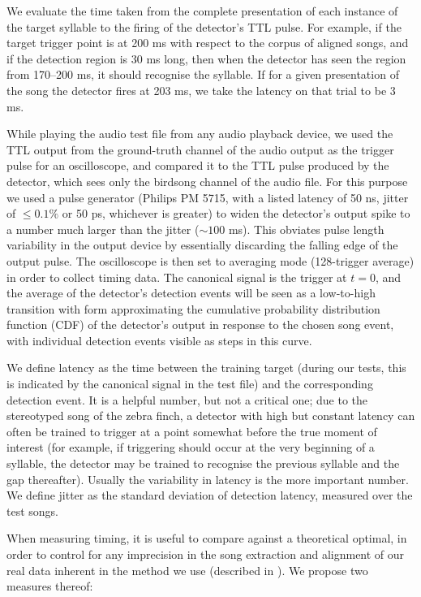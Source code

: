 \documentclass[10pt,letterpaper]{article}
\begin{document}
We evaluate the time taken from the complete presentation of each
instance of the target syllable to the firing of the detector's TTL
pulse.  For example, if the target trigger point is at 200 ms with
respect to the corpus of aligned songs, and if the detection region is
30 ms long, then when the detector has seen the region from 170--200
ms, it should recognise the syllable.  If for a given presentation of
the song the detector fires at 203 ms, we take the latency on that
trial to be 3 ms.

While playing the audio test file from any audio playback device, we
used the TTL output from the ground-truth channel of the audio output
as the trigger pulse for an oscilloscope, and compared it to the TTL
pulse produced by the detector, which sees only the birdsong channel
of the audio file. For this purpose we used a pulse generator (Philips
PM 5715, with a listed latency of 50 ns, jitter of $\leq 0.1\%$ or 50
ps, whichever is greater) to widen the detector's output spike to a
number much larger than the jitter ($\sim 100$ ms).  This obviates
pulse length variability in the output device by essentially
discarding the falling edge of the output pulse.  The oscilloscope is
then set to averaging mode (128-trigger average) in order to collect
timing data. The canonical signal is the trigger at $t=0$, and the
average of the detector's detection events will be seen as a
low-to-high transition with form approximating the cumulative
probability distribution function (CDF) of the detector's output in
response to the chosen song event, with individual detection events
visible as steps in this curve.

We define latency as the time between the training target (during our tests, this is indicated by the canonical
signal in the test file) and the corresponding detection event.  It is a helpful number,
but not a critical one; due to the stereotyped song of the zebra finch, a detector with high but
constant latency can often be trained to trigger at a point somewhat
before the true moment of interest (for example, if triggering should
occur at the very beginning of a syllable, the detector may be trained 
to recognise the previous syllable and the gap thereafter).  Usually the 
variability in latency is the more important number.  We define jitter as 
the standard deviation of detection latency, measured over the test songs.

When measuring timing, it is useful to compare against a theoretical
optimal, in order to control for any imprecision in the song
extraction and alignment of our real data inherent in the method we
use (described in \cite{Poole2012}).  We propose two measures thereof:
\end{document}
